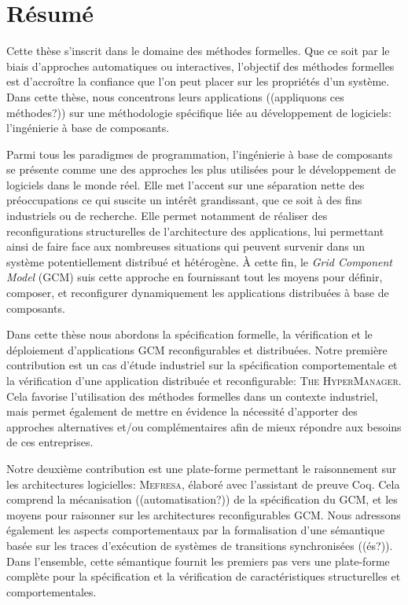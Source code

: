 


\chapter*{\centering R\'esum\'e}

Cette thèse s'inscrit dans le domaine des méthodes formelles. 
Que ce soit par le biais d'approches automatiques ou interactives, l'objectif des méthodes formelles 
est d'accroître la confiance que l'on peut placer sur les propriétés d'un système. 
Dans cette thèse, nous concentrons leurs applications ((appliquons ces méthodes?)) sur une méthodologie spécifique liée au développement de logiciels: l'ingénierie à base de composants. 


Parmi tous les paradigmes de programmation, l'ingénierie à base de composants se présente comme une 
des approches les plus utilisées pour le développement de logiciels dans le monde réel. Elle met l'accent 
sur une séparation nette des préoccupations ce qui suscite un intérêt grandissant, que ce soit à des fins industriels 
ou de recherche. Elle permet notamment de réaliser des reconfigurations structurelles 
de l'architecture des applications, lui permettant ainsi de faire face aux nombreuses situations 
qui peuvent survenir dans un système potentiellement distribué et hétérogène. 
À cette fin, le \textit{Grid Component Model} (GCM) suis cette approche en fournissant tout  
les moyens pour définir, composer, et reconfigurer dynamiquement les applications distribuées 
à base de composants.


Dans cette thèse nous abordons la spécification formelle, la vérification et le déploiement
 d'applications GCM reconfigurables et distribuées. Notre première contribution est un cas d'étude 
industriel 
 sur la spécification comportementale et la vérification d'une application distribuée et 
 reconfigurable: \textsc{The HyperManager}. 
Cela favorise l'utilisation des méthodes formelles dans un contexte industriel, 
     mais permet également de mettre en évidence la nécessité d'apporter des approches alternatives et/ou complémentaires 
afin de mieux répondre aux besoins de ces entreprises. 

Notre deuxième contribution est une plate-forme permettant le raisonnement sur ​​les architectures logicielles: \textsc {Mefresa}, élaboré avec l'assistant de preuve Coq. Cela comprend 
la mécanisation ((automatisation?)) de la spécification du GCM, et les moyens pour 
raisonner sur les architectures reconfigurables GCM. Nous adressons également
les aspects comportementaux par la formalisation d'une sémantique basée sur les traces d'exécution de 
systèmes de transitions synchronisées ((és?)). 
Dans l'ensemble, cette sémantique fournit les premiers pas vers une plate-forme complète pour la spécification 
et la vérification de caractéristiques structurelles et comportementales.

